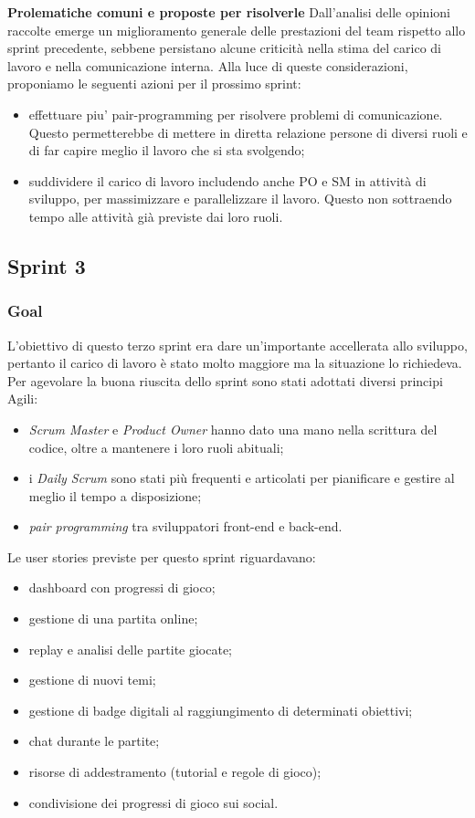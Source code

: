 \documentclass{article}
\begin{document}
\noindent
\textbf{Prolematiche comuni e proposte per risolverle}
Dall'analisi delle opinioni raccolte emerge un miglioramento generale delle prestazioni del team rispetto allo sprint precedente, sebbene persistano alcune criticità 
nella stima del carico di lavoro e nella comunicazione interna. Alla luce di queste considerazioni, proponiamo le seguenti azioni per il prossimo sprint:
\begin{itemize}
    \item effettuare piu' pair-programming per risolvere problemi di comunicazione. Questo permetterebbe di mettere in diretta relazione persone di diversi ruoli e 
    di far capire meglio il lavoro che si sta svolgendo;
    \item suddividere il carico di lavoro includendo anche PO e SM in attività di sviluppo, per massimizzare e parallelizzare il lavoro. Questo non sottraendo tempo 
    alle attività già previste dai loro ruoli.
\end{itemize}

\subsection{Sprint 3}

\subsubsection{Goal}
L'obiettivo di questo terzo sprint era dare un'importante accellerata allo sviluppo, pertanto il carico di lavoro è stato molto maggiore ma la situazione lo richiedeva.
Per agevolare la buona riuscita dello sprint sono stati adottati diversi principi Agili:
\begin{itemize}
    \item \textit{Scrum Master} e \textit{Product Owner} hanno dato una mano nella scrittura del codice, oltre a mantenere i loro ruoli abituali;
    \item i \textit{Daily Scrum} sono stati più frequenti e articolati per pianificare e gestire al meglio il tempo a disposizione;
    \item \textit{pair programming} tra sviluppatori front-end e back-end.
\end{itemize}
Le user stories previste per questo sprint riguardavano: 
\begin{itemize}
    \item dashboard con progressi di gioco;
    \item gestione di una partita online;
    \item replay e analisi delle partite giocate;
    \item gestione di nuovi temi;
    \item gestione di badge digitali al raggiungimento di determinati obiettivi;
    \item chat durante le partite;
    \item risorse di addestramento (tutorial e regole di gioco);
    \item condivisione dei progressi di gioco sui social.
\end{itemize}
\end{document}
